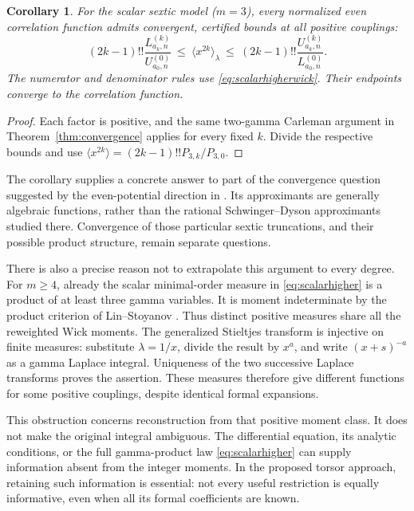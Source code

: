 \documentclass[11pt]{article}
\newtheorem{corollary}[theorem]{Corollary}
\theoremstyle{definition}
\numberwithin{equation}{section}
\begin{document}
\begin{corollary}\label{cor:sextic}
For the scalar sextic model ($m=3$), every normalized even correlation
function admits convergent, certified bounds at all positive couplings:
\begin{equation}\label{eq:ratio}
 (2k-1)!!\frac{L_{a_k,n}^{(k)}}{U_{a_0,n}^{(0)}}
 \ \le\ \langle x^{2k}\rangle_\lambda
 \ \le\ (2k-1)!!\frac{U_{a_k,n}^{(k)}}{L_{a_0,n}^{(0)}}.
\end{equation}
The numerator and denominator rules use \eqref{eq:scalarhigherwick}.
Their endpoints converge to the correlation function.
\end{corollary}
\begin{proof}
Each factor is positive, and the same two-gamma Carleman argument in
Theorem~\ref{thm:convergence} applies for every fixed $k$.
Divide the respective bounds and use
$\langle x^{2k}\rangle=(2k-1)!!P_{3,k}/P_{3,0}$.
\end{proof}

The corollary supplies a concrete answer to part of the convergence
question suggested by the even-potential direction in \cite{FGL}.
Its approximants are generally algebraic functions, rather than the
rational Schwinger--Dyson approximants studied there. Convergence of
those particular sextic truncations, and their possible product
structure, remain separate questions.

There is also a precise reason not to extrapolate this argument to every
degree. For $m\ge4$, already the scalar minimal-order measure in
\eqref{eq:scalarhigher} is a product of at least three gamma variables.
It is moment indeterminate by the product criterion of Lin--Stoyanov
\cite[Corollary 1]{LinStoyanov}. Thus distinct positive measures share
all the reweighted Wick moments. The generalized Stieltjes transform
is injective on finite measures: substitute $\lambda=1/x$, divide the
result by $x^a$, and write $(x+s)^{-a}$ as a gamma Laplace integral.
Uniqueness of the two successive Laplace transforms proves the assertion.
These measures therefore give different functions for some positive
couplings, despite identical formal expansions.

This obstruction concerns reconstruction from that positive moment class.
It does not make the original integral ambiguous. The differential
equation, its analytic conditions, or the full gamma-product law
\eqref{eq:scalarhigher} can supply information absent from the integer
moments. In the proposed torsor approach, retaining such information is
essential: not every useful restriction is equally informative, even
when all its formal coefficients are known.
\end{document}
